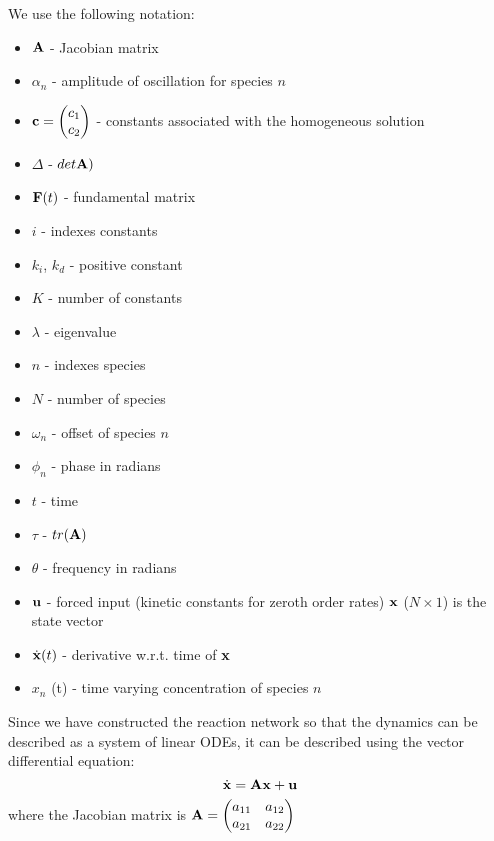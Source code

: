 \documentclass{bmcart}
\begin{document}
We use the following notation: 
\begin{itemize}
\item ${\bf A}$ - Jacobian matrix
\item $\alpha_n$ - amplitude of oscillation for species $n$
\item ${\bf c} = \begin{pmatrix} c_1 \\ c_2 \end{pmatrix}$ - constants associated with the homogeneous solution
\item $\Delta$ -
$det {\bf A})$
\item  ${\bf F} (t)$ - fundamental matrix
\item $i$ - indexes constants
\item $k_i$, $k_d$ -
positive constant 
\item $K$ - number of constants
\item $\lambda$ -
eigenvalue
\item $n$ - indexes species
\item $N$ - number of species
\item $\omega_n$ - offset of species $n$ 
\item $\phi_n$ - phase in radians
\item $t$ - time 
\item $\tau$ - $tr({\bf A})$ 
\item $\theta$ - frequency in
radians 
\item ${\bf u}$ - forced input (kinetic constants for zeroth order
rates)  ${\bf x}$ ($N \times 1$) is the state vector
\item $\dot{\bf x} (t)$ - derivative w.r.t. time of ${\bf x}$
\item $x_n$
(t) - time varying concentration of species $n$
\end{itemize}

Since we have constructed the reaction network so that the dynamics can
be described as a system of linear ODEs, it can be described using the
vector differential equation: 
\begin{equation*}
\dot{\bf x} = {\bf A} {\bf x} + {\bf u}
\end{equation*} where the Jacobian matrix is
${\bf A} = \begin{pmatrix} a_{11} & a_{12} \\ a_{21} & a_{22} \\ \end{pmatrix}$

\end{document}

